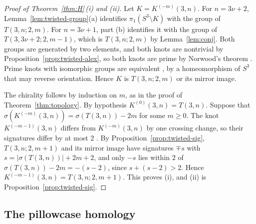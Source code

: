 \begin{proof}[Proof of Theorem~\ref{thm:H}\,(i) and (ii)]
Let $K=K^{(-m)}(3,n)$. For $n=3\nu+2$, Lemma~\ref{lem:twisted-group}(a) identifies $\pi_1(S^3\setminus K)$ with the
group of $T(3,n;2,m)$. For $n=3\nu+1$, part (b) identifies it with the group of $T(3,3\nu+2;2,m-1)$, which is
$T(3,n;2,m)$ by Lemma~\ref{lem:conj}. Both groups are generated by two elements, and both knots are
nontrivial by Proposition~\ref{prop:twisted-alex}, so both knots are prime by Norwood's
theorem \cite{Norwood}. Prime knots with isomorphic groups are equivalent \cite[Cor.~2.1]{GordonLuecke},
by a homeomorphism of $S^3$ that may reverse orientation. Hence $K$ is $T(3,n;2,m)$ or its mirror image.

The chirality follows by induction on $m$, as in the proof of Theorem~\ref{thm:topology}. By hypothesis
$K^{(0)}(3,n)=T(3,n)$. Suppose that $\sigma(K^{(-m)}(3,n))=\sigma(T(3,n))-2m$ for some $m\ge0$. The knot $K^{(-m-1)}(3,n)$
differs from $K^{(-m)}(3,n)$ by one crossing change, so their signatures differ by at most
$2$ \cite[(10.2)]{Murasugi}. By Proposition~\ref{prop:twisted-sig}, $T(3,n;2,m+1)$ and its mirror image have
signatures $\mp s$ with $s=|\sigma(T(3,n))|+2m+2$, and only $-s$ lies within $2$ of $\sigma(T(3,n))-2m=-(s-2)$,
since $s+(s-2)>2$. Hence $K^{(-m-1)}(3,n)=T(3,n;2,m+1)$. This proves (i), and (ii) is
Proposition~\ref{prop:twisted-sig}.
\end{proof}

\subsection{The pillowcase homology}\label{ss:twisted-pillow}

